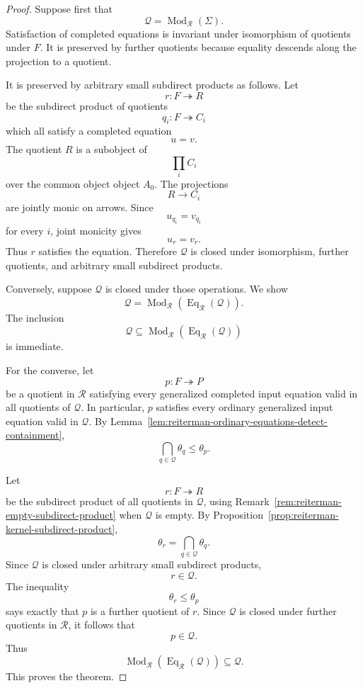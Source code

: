\begin{proof}
Suppose first that
\[
\mathcal Q=\operatorname{Mod}_{\mathcal R}(\Sigma).
\]
Satisfaction of completed equations is invariant under isomorphism of
quotients under \(F\). It is preserved by further quotients because equality
descends along the projection to a quotient.

It is preserved by arbitrary small subdirect products as follows. Let
\[
r:F\twoheadrightarrow R
\]
be the subdirect product of quotients
\[
q_i:F\twoheadrightarrow C_i
\]
which all satisfy a completed equation
\[
u=v.
\]
The quotient \(R\) is a subobject of
\[
\prod_i C_i
\]
over the common object object \(A_0\). The projections
\[
R\to C_i
\]
are jointly monic on arrows. Since
\[
u_{q_i}=v_{q_i}
\]
for every \(i\), joint monicity gives
\[
u_r=v_r.
\]
Thus \(r\) satisfies the equation. Therefore \(\mathcal Q\) is closed under
isomorphism, further quotients, and arbitrary small subdirect products.

Conversely, suppose \(\mathcal Q\) is closed under those operations. We show
\[
\mathcal Q
=
\operatorname{Mod}_{\mathcal R}
(\operatorname{Eq}_{\mathcal R}(\mathcal Q)).
\]
The inclusion
\[
\mathcal Q
\subseteq
\operatorname{Mod}_{\mathcal R}
(\operatorname{Eq}_{\mathcal R}(\mathcal Q))
\]
is immediate.

For the converse, let
\[
p:F\twoheadrightarrow P
\]
be a quotient in \(\mathcal R\) satisfying every generalized completed input
equation valid in all quotients of \(\mathcal Q\). In particular, \(p\)
satisfies every ordinary generalized input equation valid in \(\mathcal Q\).
By Lemma~\ref{lem:reiterman-ordinary-equations-detect-containment},
\[
\bigcap_{q\in\mathcal Q}\theta_q
\leq
\theta_p.
\]

Let
\[
r:F\twoheadrightarrow R
\]
be the subdirect product of all quotients in \(\mathcal Q\), using
Remark~\ref{rem:reiterman-empty-subdirect-product} when \(\mathcal Q\) is
empty. By Proposition~\ref{prop:reiterman-kernel-subdirect-product},
\[
\theta_r
=
\bigcap_{q\in\mathcal Q}\theta_q.
\]
Since \(\mathcal Q\) is closed under arbitrary small subdirect products,
\[
r\in\mathcal Q.
\]
The inequality
\[
\theta_r\leq\theta_p
\]
says exactly that \(p\) is a further quotient of \(r\). Since \(\mathcal Q\)
is closed under further quotients in \(\mathcal R\), it follows that
\[
p\in\mathcal Q.
\]
Thus
\[
\operatorname{Mod}_{\mathcal R}
(\operatorname{Eq}_{\mathcal R}(\mathcal Q))
\subseteq
\mathcal Q.
\]
This proves the theorem.
\end{proof}

